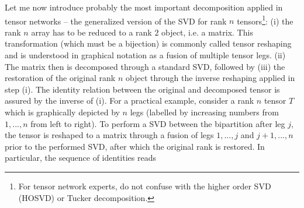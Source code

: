 \documentclass{svmono}
\def\pdag{{\vphantom\dag}}
\providecommand{\DIFdelbegin}{} %
\newcommand{\DIFscaledelfig}{0.5}
\newlength{\DIFdelgraphicswidth} %
\newlength{\DIFdelgraphicsheight} %
\newcommand{\DIFdelincludegraphics}[2][]{%
\sbox{\DIFdelgraphicsbox}{\DIFOincludegraphics[#1]{#2}}%
\settoboxwidth{\DIFdelgraphicswidth}{\DIFdelgraphicsbox} %
\settoboxtotalheight{\DIFdelgraphicsheight}{\DIFdelgraphicsbox} %
\scalebox{\DIFscaledelfig}{%
\parbox[b]{\DIFdelgraphicswidth}{\usebox{\DIFdelgraphicsbox}\\[-\baselineskip] \rule{\DIFdelgraphicswidth}{0em}}\llap{\resizebox{\DIFdelgraphicswidth}{\DIFdelgraphicsheight}{%
\setlength{\unitlength}{\DIFdelgraphicswidth}%
\begin{picture}(1,1)%
\thicklines\linethickness{2pt} %
{\color[rgb]{1,0,0}\put(0,0){\framebox(1,1){}}}%
{\color[rgb]{1,0,0}\put(0,0){\line( 1,1){1}}}%
{\color[rgb]{1,0,0}\put(0,1){\line(1,-1){1}}}%
\end{picture}%
}\hspace*{3pt}}} %
} %
\DeclareRobustCommand{\DIFdelbegin}{\DIFOdelbegin \let\includegraphics\DIFdelincludegraphics} %
\begin{document}
Let me now introduce probably the most important decomposition applied in tensor networks -- the generalized version of the SVD for rank $n$ tensors\footnote{For tensor network experts, do not confuse with the higher order SVD (HOSVD) or Tucker decomposition.}:
(i) the rank $n$ array has to be reduced to a rank $2$ object, i.e. a matrix.
This transformation (which must be a bijection) is commonly called tensor reshaping and is understood in graphical notation as a fusion of multiple tensor legs.
(ii) The matrix then is decomposed through a standard SVD, followed by (iii) the restoration of the original rank $n$ object through the inverse reshaping applied in step (i).
The identity relation between the original and decomposed tensor is assured by the inverse of (i).
For a practical example, consider a rank $n$ tensor $T$ which is graphically depicted by $n$ legs (labelled by increasing numbers from $1,...,n$ from left to right).
To perform a SVD between the bipartition after leg $j$, the tensor is reshaped to a matrix through a fusion of legs $1,...,j$ and $j+1,...,n$ prior to the performed SVD, after which the original rank is restored.
In particular, the sequence of identities reads
\DIFdelbegin %
\end{document}
